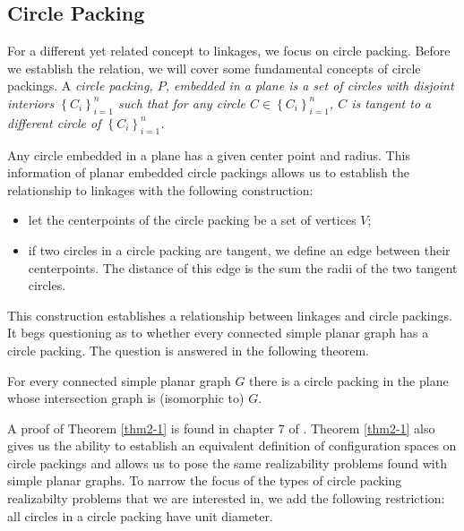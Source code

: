 \subsection{Circle Packing}
For a different yet related concept to linkages, we focus on circle packing.  Before we establish the relation, we will cover some fundamental concepts of circle packings.  A \it{circle packing}, $P$, embedded in a plane  is a set of circles with disjoint interiors $\left\lbrace C_i \right\rbrace_{i = 1}^n $ such that for any circle $C \in \left\lbrace C_i \right\rbrace_{i = 1}^n$, $C$ is tangent to a different circle of $\left\lbrace C_i \right\rbrace_{i = 1}^n$. 

Any circle embedded in a plane has a given center point and radius.  This information of planar embedded circle packings allows us to establish the relationship to linkages with the following construction:
\begin{itemize}
\item[\rn{1}] let the centerpoints of the circle packing be a set of vertices $V$;
\item[\rn{2}] if two circles in a circle packing are tangent, we define an edge between their centerpoints.  The distance of this edge is the sum the radii of the two tangent circles.
\end{itemize}  
This construction establishes a relationship between linkages and circle packings.  It begs questioning as to whether every connected simple planar graph has a circle packing.  The question is answered in the following theorem.
\begin{thm}\label{thm2-1}
For every connected simple planar graph $G$ there is a circle packing in the
plane whose intersection graph is (isomorphic to) $G$.
\end{thm}
A proof of Theorem \ref{thm2-1} is found in chapter 7 of \cite{stephenson2005introduction}.  Theorem \ref{thm2-1} also gives us the ability to establish an equivalent definition of configuration spaces on circle packings and allows us to pose the same realizability problems found with simple planar graphs.  To narrow the focus of the types of circle packing realizabilty problems that we are interested in, we add the following restriction: all circles in a circle packing have unit diameter. 

